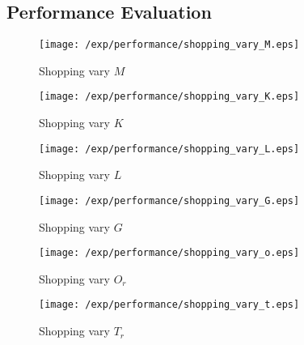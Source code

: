 \subsection{Performance Evaluation}
\begin{figure*}[t]
\centering
    \begin{subfigure}[b]{0.16\textwidth}
        \texttt{[image: /exp/performance/shopping\_vary\_M.eps]}
        \caption{Shopping vary $M$}
    \end{subfigure}
    \begin{subfigure}[b]{0.16\textwidth}
        \texttt{[image: /exp/performance/shopping\_vary\_K.eps]}
        \caption{Shopping vary $K$}
    \end{subfigure}
    \begin{subfigure}[b]{0.16\textwidth}
        \texttt{[image: /exp/performance/shopping\_vary\_L.eps]}
        \caption{Shopping vary $L$}
    \end{subfigure}
       \begin{subfigure}[b]{0.16\textwidth}
        \texttt{[image: /exp/performance/shopping\_vary\_G.eps]}
        \caption{Shopping vary $G$}
    \end{subfigure}
	\begin{subfigure}[b]{0.16\textwidth}
	 \texttt{[image: /exp/performance/shopping\_vary\_o.eps]}
        \caption{Shopping vary $O_r$}
    \end{subfigure}
        \begin{subfigure}[b]{0.16\textwidth}
	 \texttt{[image: /exp/performance/shopping\_vary\_t.eps]}
        \caption{Shopping vary $T_r$}
    \end{subfigure}
        

\end{figure*}
